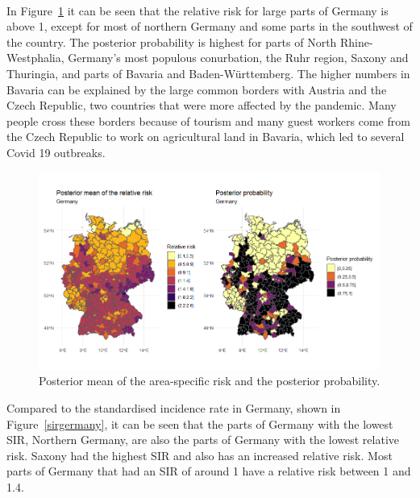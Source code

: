 \\
In Figure~\ref{posteriorGermanyDemo} it can be seen that the relative risk for large parts of Germany is above 1, except for most of northern Germany and some parts in the southwest of the country. The posterior probability is highest for parts of North Rhine-Westphalia, Germany's most populous conurbation, the Ruhr region, Saxony and Thuringia, and parts of Bavaria and Baden-Württemberg. The higher numbers in Bavaria can be explained by the large common borders with Austria and the Czech Republic, two countries that were more affected by the pandemic. Many people cross these borders because of tourism and many guest workers come from the Czech Republic to work on agricultural land in Bavaria, which led to several Covid 19 outbreaks.
\begin{figure}[H]
    \centering
    \includegraphics[width = \textwidth]{posterior_germany_demo.png}
    \caption{Posterior mean of the area-specific risk and the posterior probability.}
    \label{posteriorGermanyDemo}
\end{figure}
%     
Compared to the standardised incidence rate in Germany, shown in Figure~\ref{sirgermany}, it can be seen that the parts of Germany with the lowest SIR, Northern Germany, are also the parts of Germany with the lowest relative risk. Saxony had the highest SIR and also has an increased relative risk. Most parts of Germany that had an SIR of around 1 have a relative risk between 1 and 1.4.
